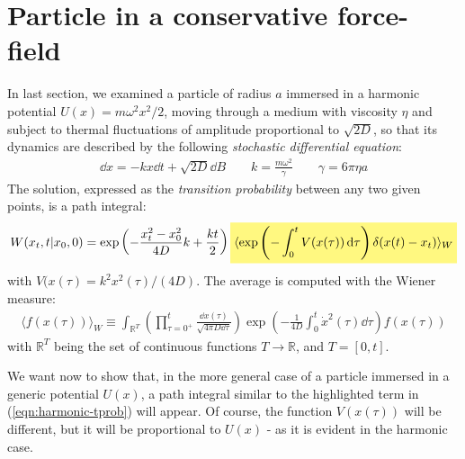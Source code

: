 \documentclass[../template.tex]{subfiles}
\begin{document}
\section{Particle in a conservative force-field}
In last section, we examined a particle of radius $a$ immersed in a harmonic potential $U(x) = m \omega^2 x^2/2$, moving through a medium with viscosity $\eta$ and subject to thermal fluctuations of amplitude proportional to $\sqrt{2D}$, so that its dynamics are described by the following \textit{stochastic differential equation}: 
\begin{align*}
    \dd{x} = -k x \dd{t} + \sqrt{2D} \dd{B}    \qquad k = \frac{m \omega^2}{\gamma}\qquad \gamma = 6 \pi \eta a 
\end{align*}
The solution, expressed as the \textit{transition probability} between any two given points, is a path integral:
\begin{align}\label{eqn:harmonic-tprob}
    W(x_t,t|x_0,0) = \exp\left(-\frac{x_t^2 - x_0^2}{4D}k + \frac{kt}{2}  \right) \hlc{Yellow}{\langle \exp\left(-\int_0^t V(x(\tau)) \dd{\tau}\right) \delta(x(t) - x_t) \rangle_W}  
\end{align}
with $V(x(\tau) = {k^2 x^2(\tau)}/({4D})$. The average is computed with the Wiener measure:
\begin{align*}
    \langle f(x(\tau)) \rangle_W \equiv \int_{\mathbb{R}^T} \left(\prod_{\tau=0^+}^t \frac{\dd{x(\tau)}}{\sqrt{4 \pi D \dd{\tau}}} \right) \exp\left(-\frac{1}{4D} \int_0^t \dot{x}^2 (\tau) \dd{\tau} \right) f(x(\tau))
\end{align*}
with $\mathbb{R}^T$ being the set of continuous functions $T \to \mathbb{R}$, and $T=[0,t]$.
\medskip

We want now to show that, in the more general case of a particle immersed in a generic potential $U(x)$, a path integral similar to the highlighted term in (\ref{eqn:harmonic-tprob}) will appear. Of course, the function $V(x(\tau))$ will be different, but it will be proportional to $U(x)$ - as it is evident in the harmonic case.

\medskip
\end{document}
